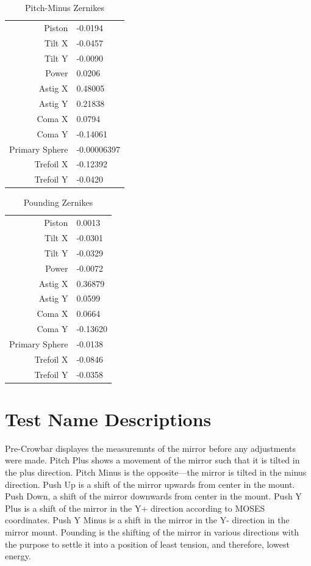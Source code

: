 \documentclass{article}
\begin{document}
\begin{table}[H]
	\centering
	\begin{tabular}{r|p{1in}} \hline
		Piston &-0.0194\\
		Tilt X &-0.0457\\
		Tilt Y &-0.0090\\
		Power &0.0206\\
		Astig X &0.48005\\
		Astig Y &0.21838\\
		Coma X &0.0794\\
		Coma Y &-0.14061\\
		Primary Sphere &-0.00006397\\
		Trefoil X &-0.12392\\
		Trefoil Y &-0.0420
	\end{tabular}
	\caption{Pitch-Minus Zernikes}
	\label{pitchminus}
\end{table}
\begin{table}[H]
	\centering
	\begin{tabular}{r|p{1in}} \hline
		Piston &0.0013\\
		Tilt X &-0.0301\\
		Tilt Y &-0.0329\\
		Power &-0.0072\\
		Astig X &0.36879\\
		Astig Y &0.0599\\
		Coma X &0.0664\\
		Coma Y &-0.13620\\
		Primary Sphere &-0.0138\\
		Trefoil X &-0.0846\\
		Trefoil Y &-0.0358
	\end{tabular}
	\caption{Pounding Zernikes}
	\label{pound}
\end{table}

\section{Test Name Descriptions}\label{descriptors}
Pre-Crowbar displayes the measuremnts of the mirror before any adjustments were made. Pitch Plus shows a movement of the mirror such that it is tilted in the plus direction. Pitch Minus is the opposite---the mirror is tilted in the minus direction. Push Up is a shift of the mirror upwards from center in the mount. Push Down, a shift of the mirror downwards from center in the mount. Push  Y Plus is a shift of the mirror in the Y+ direction according to MOSES coordinates. Push Y Minus is a shift in the mirror in the Y- direction in the mirror mount. Pounding is the shifting of the mirror in various directions with the purpose to settle it into a position of least tension, and therefore, lowest energy.
\end{document}
